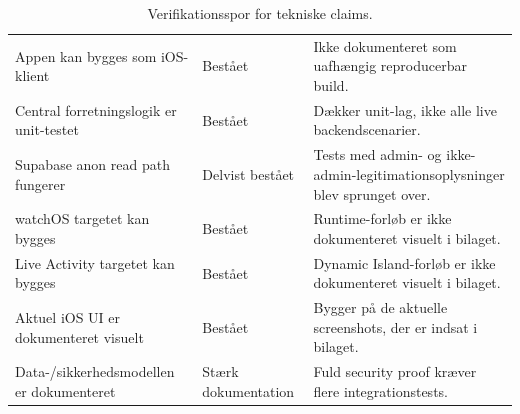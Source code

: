 \begin{table}[htbp]
\small
\renewcommand{\arraystretch}{1.15}
\begin{tabularx}{\textwidth}{>{\RaggedRight\arraybackslash}p{} >{\RaggedRight\arraybackslash}p{} Y}
\toprule
{} &  &  \\
\midrule
Appen kan bygges som iOS-klient & Bestået & Ikke dokumenteret som uafhængig reproducerbar build. \\
Central forretningslogik er unit-testet & Bestået & Dækker unit-lag, ikke alle live backendscenarier. \\
Supabase anon read path fungerer & Delvist bestået & Tests med admin- og ikke-admin-legitimationsoplysninger blev sprunget over. \\
watchOS targetet kan bygges & Bestået & Runtime-forløb er ikke dokumenteret visuelt i bilaget. \\
Live Activity targetet kan bygges & Bestået & Dynamic Island-forløb er ikke dokumenteret visuelt i bilaget. \\
Aktuel iOS UI er dokumenteret visuelt & Bestået & Bygger på de aktuelle screenshots, der er indsat i bilaget. \\
Data-/sikkerhedsmodellen er dokumenteret & Stærk dokumentation & Fuld security proof kræver flere integrationstests. \\
\bottomrule
\end{tabularx}
\caption{Verifikationsspor for tekniske claims.}
\label{tab:tm-test-traceability}
\end{table}

\clearpage
\fussy
